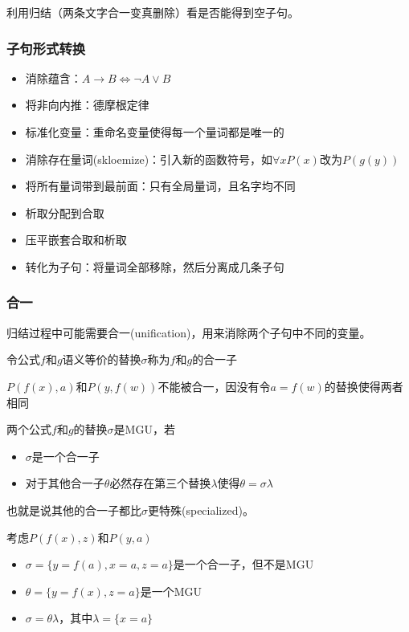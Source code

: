 利用归结（两条文字合一变真删除）看是否能得到空子句。

\subsubsection{子句形式转换}
\begin{itemize}
	\item 消除蕴含：$A\to B\iff \lnot A\lor B$
	\item 将非向内推：德摩根定律
	\item 标准化变量：重命名变量使得每一个量词都是唯一的
	\item 消除存在量词(skloemize)：引入新的函数符号，如$\forall x P(x)$改为$P(g(y))$
	\item 将所有量词带到最前面：只有全局量词，且名字均不同
	\item 析取分配到合取
	\item 压平嵌套合取和析取
	\item 转化为子句：将量词全部移除，然后分离成几条子句
\end{itemize}

\subsubsection{合一}
归结过程中可能需要合一(unification)，用来消除两个子句中不同的变量。
\begin{definition}
令公式$f$和$g$语义等价的替换$\sigma$称为$f$和$g$的合一子
\end{definition}
\begin{example}
$P(f(x),a)$和$P(y,f(w))$不能被合一，因没有令$a=f(w)$的替换使得两者相同
\end{example}

\begin{definition}
两个公式$f$和$g$的替换$\sigma$是MGU，若
\begin{itemize}
	\item $\sigma$是一个合一子
	\item 对于其他合一子$\theta$必然存在第三个替换$\lambda$使得$\theta=\sigma\lambda$
\end{itemize}
也就是说其他的合一子都比$\sigma$更特殊(specialized)。
\end{definition}
\begin{example}
考虑$P(f(x),z)$和$P(y,a)$
\begin{itemize}
	\item $\sigma=\{y=f(a),x=a,z=a\}$是一个合一子，但不是MGU
	\item $\theta=\{y=f(x),z=a\}$是一个MGU
	\item $\sigma=\theta\lambda$，其中$\lambda=\{x=a\}$
\end{itemize}
\end{example}

